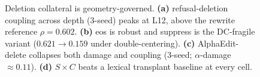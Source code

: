 \begin{figure}[tb]
\centering

\caption{Deletion collateral is geometry-governed. \textbf{(a)} refusal-deletion
coupling across depth (3-seed) peaks at L12, above the rewrite reference $\rho{=}0.602$.
\textbf{(b)} eos is robust and suppress is the DC-fragile variant ($0.621\!\to\!0.159$
under double-centering). \textbf{(c)} AlphaEdit-delete collapses both damage and coupling
(3-seed; $\alpha$-damage $\approx0.11$). \textbf{(d)} $S\times C$ beats a lexical
transplant baseline at every cell.}
\label{fig:deletion}
\end{figure}
